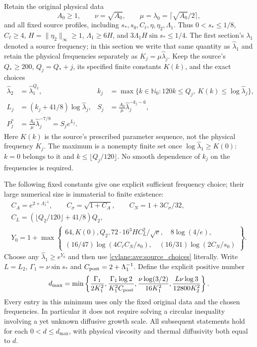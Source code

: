 Retain the original physical data
\[
 A_0\geq1,\qquad\nu=\sqrt{A_0},\qquad
 \mu=\lambda_0=\lceil\sqrt{A_0}/2\rceil,
\]
and all fixed source profiles, including
$s_*,s_0,C_\ell,\eta,\eta_2,\Lambda_1$.
Thus $0<s_*\leq1/8$, $C_\ell\geq4$, $H=\|\eta_2\|_\infty\geq1$,
$\Lambda_1\geq6H$, and $3\Lambda_1H\sin s_*\leq1/4$.
The first section's $\lambda_1$ denoted a source frequency; in this section
we write that same quantity as $\widehat\lambda_1$ and retain the
physical frequencies separately as $K_j=\mu\widehat\lambda_j$.
Keep the source's $Q_*\geq200$, $Q_j=Q_*+j$, its specified finite
constants $K(k)$, and the exact choices
\begin{align}
 \widehat\lambda_2&=\widehat\lambda_1^{Q_2},&
 k_j&=\max\{k\in\mathbb N_0:120k\leq Q_j,
                   \ K(k)\leq\log\widehat\lambda_j\},\nonumber\\
 L_j&=(k_j+41/8)\log\widehat\lambda_j,&
 S_j&=\frac{A_0}{\mu}\widehat\lambda_j^{-k_j-6},\nonumber\\
 P_j^*&=\frac{A_0}{\mu}\widehat\lambda_j^{-7/8}=S_je^{L_j}.
 \label{cvlane:ave:source_choices}
\end{align}
Here $K(k)$ is the source's prescribed parameter sequence, not the
physical frequency $K_j$. The maximum is a nonempty finite set once
$\log\widehat\lambda_1\geq K(0)$: $k=0$ belongs to it and
$k\leq\lfloor Q_j/120\rfloor$. No smooth dependence of $k_j$ on the
frequencies is required.

The following fixed constants give one explicit sufficient frequency
choice; their large numerical size is immaterial to finite existence:
\begin{equation}\label{cvlane:ave:Ychoice}
\begin{gathered}
 C_A=e^{2+\Lambda_1^{-1}},\qquad
 C_\sigma=\sqrt{1+C_A},\qquad C_N=1+3C_\sigma/32,\\
 C_L=(\lfloor Q_2/120\rfloor+41/8)Q_2,\\
 Y_0=1+\max\left\{
 \begin{gathered}
 64,K(0),Q_2,72\cdot16^3HC_L^2/\sqrt e,\quad8\log(4/e),\\
 (16/47)\log(4C_\ell C_N/s_0),\quad
 (16/31)\log(2C_N/s_0)
 \end{gathered}\right\}.
\end{gathered}
\end{equation}
Choose any $\widehat\lambda_1\geq e^{Y_0}$ and then use
\eqref{cvlane:ave:source_choices} literally. Write $L=L_2$,
$\Gamma_1=\nu\sin s_*$ and $C_{\rm post}=2+\Lambda_1^{-1}$.
Define the explicit positive number
\begin{equation}\label{cvlane:ave:dmax}
 d_{\max}=\min\left\{
 \frac{\Gamma_1}{2K_1^2},
 \frac{\Gamma_1\log2}{K_1^2C_{\rm post}},
 \frac{\nu\log(3/2)}{16K_1^2},
 \frac{L\nu\log3}{12800K_2^2}\right\}.
\end{equation}
Every entry in this minimum uses only the fixed original data and
the chosen frequencies. In particular it does not require solving
a circular inequality involving a yet unknown diffusive growth scale.
All subsequent statements hold for each $0<d\leq d_{\max}$, with
physical viscosity and thermal diffusivity both equal to $d$.

